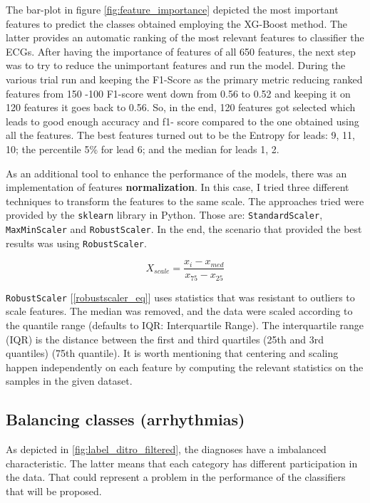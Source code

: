 The bar-plot in figure \ref{fig:feature_importance} depicted the most important features to predict the classes obtained employing the XG-Boost method. The latter provides an automatic ranking of the most relevant features to classifier the ECGs. After having the importance of features of all 650 features, the next step was to try to reduce the unimportant features and
run the model. During the various trial run and keeping the F1-Score as the primary metric reducing ranked features from 150 -100 F1-score went down from 0.56 to 0.52 and keeping it on 120 features it goes back to 0.56. So, in the end, 120 features got selected which leads to good enough accuracy and f1-
score compared to the one obtained using all the features. The best features turned out to be the Entropy for leads: 9, 11, 10; the percentile 5\% for lead 6; and the median for leads 1, 2.

As an additional tool to enhance the performance of the models, there was an implementation of features \textbf{normalization}. In this case, I tried three different techniques to transform the features to the same scale. The approaches tried were provided by the \texttt{sklearn} library in Python. Those are: \texttt{StandardScaler}, \texttt{MaxMinScaler} and \texttt{RobustScaler}. In the end, the scenario that provided the best results was using \texttt{RobustScaler}. 

\begin{equation} \label{robustscaler_eq}
X_{scale} = \frac{x_i - x_{med}}{x_{75} - x_{25}}
\end{equation}

\texttt{RobustScaler} [\ref{robustscaler_eq}] uses statistics that was resistant to outliers to scale features. The median was removed, and the data were scaled according to the quantile range (defaults to IQR: Interquartile Range). The interquartile range (IQR) is the distance between the first and third quartiles (25th and 3rd quantiles) (75th quantile). It is worth mentioning that centering and scaling happen independently on each feature by computing the relevant statistics on the samples in the given dataset.

\subsection{Balancing classes (arrhythmias)}

As depicted in \ref{fig:label_ditro_filtered}, the diagnoses have a imbalanced characteristic. The latter means that each category has different participation in the data. That could represent a problem in the performance of the classifiers that will be proposed.

